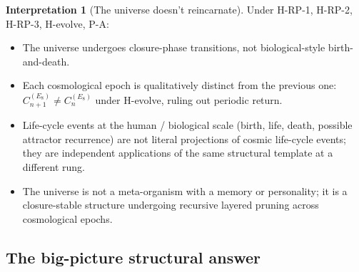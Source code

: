 \documentclass[11pt]{article}
\theoremstyle{plain}
\theoremstyle{definition}
\newtheorem{interpretation}[theorem]{Interpretation}
\theoremstyle{remark}
\begin{document}
\begin{interpretation}[The universe doesn't reincarnate]\label{int:universe-not-reincarnate}
Under H-RP-1, H-RP-2, H-RP-3, H-evolve, P-A:
\begin{itemize}[leftmargin=2em]
\item The universe undergoes closure-phase transitions, not biological-style birth-and-death.
\item Each cosmological epoch is qualitatively distinct from the previous one: $C^{(E_8)}_{n+1} \neq C^{(E_8)}_n$ under H-evolve, ruling out periodic return.
\item Life-cycle events at the human / biological scale (birth, life, death, possible attractor recurrence) are not literal projections of cosmic life-cycle events; they are independent applications of the same structural template at a different rung.
\item The universe is not a meta-organism with a memory or personality; it is a closure-stable structure undergoing recursive layered pruning across cosmological epochs.
\end{itemize}
\end{interpretation}

\subsection{The big-picture structural answer}
\end{document}

